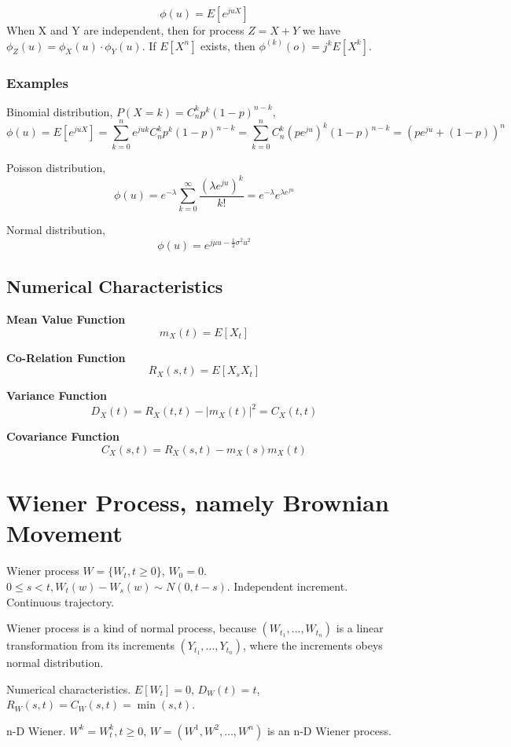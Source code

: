 $$\phi(u) = E[e^{juX}]$$
When X and Y are independent, then for process $Z=X+Y$ we have $\phi_Z(u)=\phi_X(u)\cdot\phi_Y(u)$.
If $E[X^n]$ exists, then $\phi^{(k)}(o)=j^kE[X^k]$.

\subsubsection{Examples}

Binomial distribution, $P(X=k)=C_n^kp^k(1-p)^{n-k}$,
$$\phi(u) = E[e^{juX}] = \sum_{k=0}^n e^{juk}C_n^kp^k(1-p)^{n-k} = \sum_{k=0}^n C_n^k(pe^{ju})^k(1-p)^{n-k} = (pe^{ju}+(1-p))^n$$

Poisson distribution,
$$\phi(u) = e^{-\lambda}\sum_{k=0}^\infty \frac{(\lambda e^{ju})^k}{k!} = e^{-\lambda}e^{\lambda e^{ju}}$$

Normal distribution,
$$\phi(u) = e^{j\mu u - \frac{1}{2}\sigma^2u^2}$$

\subsection{Numerical Characteristics}

{\bf Mean Value Function} $$m_X(t) = E[X_t]$$

{\bf Co-Relation Function} $$R_X(s,t) = E[X_sX_t]$$

{\bf Variance Function} $$D_X(t) = R_X(t,t) - |m_X(t)|^2 = C_X(t,t)$$

{\bf Covariance Function} $$C_X(s, t) = R_X(s,t) - m_X(s)m_X(t)$$

\section{Wiener Process, namely Brownian Movement}

Wiener process $W=\{W_t, t\geq 0\}$, $W_0=0$. $0\leq s<t, W_t(w)-W_s(w)\sim N(0,t-s)$.
Independent increment. Continuous trajectory.

Wiener process is a kind of normal process, because $(W_{t_1},\ldots,W_{t_n})$ is
a linear transformation from its increments $(Y_{t_1},\ldots,Y_{t_n})$, where
the increments obeys normal distribution.

Numerical characteristics. $E[W_t]=0$, $D_W(t)=t$, $R_W(s,t)=C_W(s,t)=\min(s,t)$.

n-D Wiener. $W^k={W_t^k, t\geq 0}$, $W=(W^1,W^2,\ldots,W^n)$ is an n-D Wiener process.

